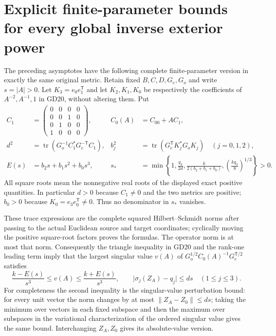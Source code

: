 \documentclass[11pt]{article}
\begin{document}
\section{Explicit finite-parameter bounds for every global inverse exterior power}
The preceding asymptotes have the following complete
finite-parameter version in exactly the same original metric.
Retain fixed $B,C,D,G_e,G_o$ and write $s=|A|>0$.
Let $K_3=e_0e_1^{\mathsf T}$ and let $K_2,K_1,K_0$
be respectively the coefficients of $A^{-2},A^{-1},1$
in GD20, without altering them. Put
\begin{equation}
\begin{aligned}
 C_1&=\begin{pmatrix}0&0&0&0\\0&0&1&0\\0&1&0&0\\1&0&0&0\end{pmatrix},
 &C_0(A)&=C_{00}+AC_1,\\
 d^2&=\operatorname{tr}(G_o^{-1}C_1^*G_e^{-\mathsf T}C_1),&
 b_j^2&=\operatorname{tr}(G_e^{\mathsf T}K_j^*G_oK_j)\quad(j=0,1,2),\\
 E(s)&=b_2s+b_1s^2+b_0s^3,&
 s_*&=\min\left\{1,\frac{q_3}{2d},
 \frac{k}{2(b_2+b_1+b_0)},\left(\frac{kq_3}{8}\right)^{1/3}\right\}>0.
\end{aligned}\tag{GD26}
\end{equation}
All square roots mean the nonnegative real roots of the
displayed exact positive quantities. In particular $d>0$
because $C_1\ne0$ and the two metrics are positive;
$b_0>0$ because $K_0=e_3e_0^{\mathsf T}\ne0$.
Thus no denominator in $s_*$ vanishes.

These trace expressions are the complete squared
Hilbert--Schmidt norms after passing to the actual
Euclidean source and target coordinates; cyclically
moving the positive square-root factors proves the
formulas. The operator norm is at most that norm.
Consequently the triangle inequality in GD20 and
the rank-one leading term imply that the largest
singular value $v(A)$ of
$G_o^{1/2}C_0(A)^{-1}G_e^{\mathsf T/2}$ satisfies
\begin{equation}
 \frac{k-E(s)}{s^3}\le v(A)\le\frac{k+E(s)}{s^3},\qquad
 \big|\sigma_j(Z_A)-q_j\big|\le ds\quad(1\le j\le3).
 \tag{GD27}
\end{equation}
For completeness the second inequality is the singular-value
perturbation bound: for every unit vector the norm changes
by at most $\|Z_A-Z_0\|\le ds$; taking the minimum over
vectors in each fixed subspace and then the maximum over
subspaces in the variational characterization of the
ordered singular value gives the same bound. Interchanging
$Z_A,Z_0$ gives its absolute-value version.
\end{document}
